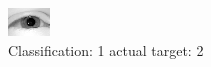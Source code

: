\begin{figure}[h!]
\begin{center}
\includegraphics[width=0.60\columnwidth]{figures/ID2295_class_1_target_2.png}
\end{center}
\caption{ Classification: 1 actual target: 2}
\label{fig:ID2295_class_1_target_2}
\end{figure}
